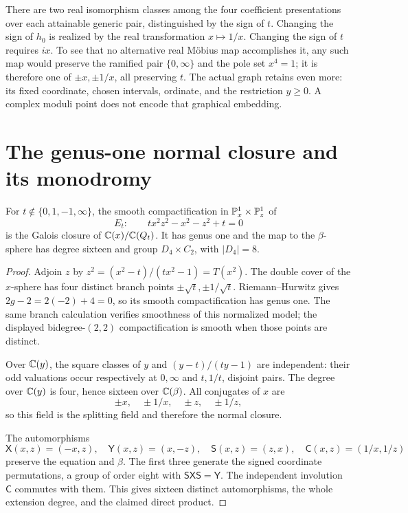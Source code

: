 There are two real isomorphism classes among the four coefficient presentations over each attainable generic pair, distinguished by the sign of \(t\). Changing the sign of \(h_0\) is realized by the real transformation \(x\mapsto1/x\). Changing the sign of \(t\) requires \(ix\). To see that no alternative real Möbius map accomplishes it, any such map would preserve the ramified pair \(\{0,\infty\}\) and the pole set \(x^4=1\); it is therefore one of \(\pm x,\pm1/x\), all preserving \(t\). The actual graph retains even more: its fixed coordinate, chosen intervals, ordinate, and the restriction \(y\ge0\). A complex moduli point does not encode that graphical embedding.

\section{The genus-one normal closure and its monodromy}\label{sec:galois}

\begin{theorem}\label{thm:galois}
For \(t\notin\{0,1,-1,\infty\}\), the smooth compactification in \(\mathbb P^1_x\times\mathbb P^1_z\) of
\begin{equation}\label{eq:Et}
E_t:\qquad tx^2z^2-x^2-z^2+t=0
\end{equation}
is the Galois closure of \(\mathbb C(x)/\mathbb C(Q_t)\). It has genus one and the map to the \(\beta\)-sphere has degree sixteen and group \(D_4\times C_2\), with \(|D_4|=8\).
\end{theorem}
\begin{proof}
Adjoin \(z\) by \(z^2=(x^2-t)/(tx^2-1)=T(x^2)\). The double cover of the \(x\)-sphere has four distinct branch points
\(\pm\sqrt t,\pm1/\sqrt t\). Riemann--Hurwitz gives
\(2g-2=2(-2)+4=0\), so its smooth compactification has genus one. The same branch calculation verifies smoothness of this normalized model; the displayed bidegree-\((2,2)\) compactification is smooth when those points are distinct.

Over \(\mathbb C(y)\), the square classes of \(y\) and \((y-t)/(ty-1)\) are independent: their odd valuations occur respectively at \(0,\infty\) and \(t,1/t\), disjoint pairs. The degree over \(\mathbb C(y)\) is four, hence sixteen over \(\mathbb C(\beta)\). All conjugates of \(x\) are
\[
\pm x,\quad\pm1/x,\quad\pm z,\quad\pm1/z,
\]
so this field is the splitting field and therefore the normal closure.

The automorphisms
\begin{equation}\label{eq:generators}
\mathsf X(x,z)=(-x,z),\quad\mathsf Y(x,z)=(x,-z),\quad
\mathsf S(x,z)=(z,x),\quad\mathsf C(x,z)=(1/x,1/z)
\end{equation}
preserve the equation and \(\beta\). The first three generate the signed coordinate permutations, a group of order eight with \(\mathsf S\mathsf X\mathsf S=\mathsf Y\). The independent involution \(\mathsf C\) commutes with them. This gives sixteen distinct automorphisms, the whole extension degree, and the claimed direct product.
\end{proof}

